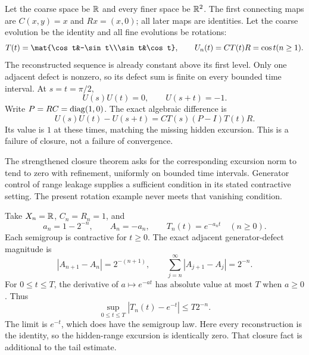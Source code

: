 Let the coarse space be $\RR$ and every finer space be $\RR^2$. The first connecting maps are $C(x,y)=x$ and $Rx=(x,0)$; all later maps are identities. Let the coarse evolution be the identity and all fine evolutions be rotations:
\[
T(t)=\mat{\cos t&-\sin t\\\sin t&\cos t},\qquad
U_n(t)=CT(t)R=\cos t\quad(n\ge1).
\]
The reconstructed sequence is already constant above its first level. Only one adjacent defect is nonzero, so its defect sum is finite on every bounded time interval.
At $s=t=\pi/2$,
\[
U(s)U(t)=0,\qquad U(s+t)=-1.
\]
Write $P=RC=\operatorname{diag}(1,0)$. The exact algebraic difference is
\[
U(s)U(t)-U(s+t)=CT(s)(P-I)T(t)R.
\]
Its value is $1$ at these times, matching the missing hidden excursion. This is a failure of closure, not a failure of convergence.

The strengthened closure theorem asks for the corresponding excursion norm to tend to zero with refinement, uniformly on bounded time intervals. Generator control of range leakage supplies a sufficient condition in its stated contractive setting. The present rotation example never meets that vanishing condition.

Take $X_n=\RR$, $C_n=R_n=1$, and
\[
a_n=1-2^{-n},\qquad A_n=-a_n,\qquad T_n(t)=e^{-a_nt}\quad(n\ge0).
\]
Each semigroup is contractive for $t\ge0$. The exact adjacent generator-defect magnitude is
\[
|A_{n+1}-A_n|=2^{-(n+1)},\qquad
\sum_{j=n}^{\infty}|A_{j+1}-A_j|=2^{-n}.
\]
For $0\le t\le T$, the derivative of $a\mapsto e^{-at}$ has absolute value at most $T$ when $a\ge0$. Thus
\[
\sup_{0\le t\le T}|T_n(t)-e^{-t}|\le T2^{-n}.
\]
The limit is $e^{-t}$, which does have the semigroup law. Here every reconstruction is the identity, so the hidden-range excursion is identically zero. That closure fact is additional to the tail estimate.

